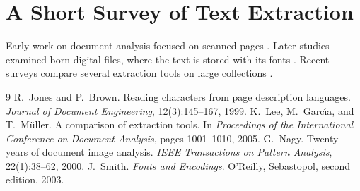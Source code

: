 \documentclass[11pt]{article}
\begin{document}
\section*{A Short Survey of Text Extraction}
Early work on document analysis focused on scanned pages \cite{nagy2000}. Later studies examined
born-digital files, where the text is stored with its fonts \cite{smith2003,jones1999}. Recent
surveys compare several extraction tools on large collections \cite{lee2005}.
\begin{thebibliography}{9}
 R.~Jones and P.~Brown. Reading characters from page description languages.
\emph{Journal of Document Engineering}, 12(3):145--167, 1999.
 K.~Lee, M.~Garc\'{\i}a, and T.~M\"uller. A comparison of extraction tools.
In \emph{Proceedings of the International Conference on Document Analysis}, pages 1001--1010, 2005.
 G.~Nagy. Twenty years of document image analysis.
\emph{IEEE Transactions on Pattern Analysis}, 22(1):38--62, 2000.
 J.~Smith. \emph{Fonts and Encodings}. O'Reilly, Sebastopol, second edition, 2003.
\end{thebibliography}
\end{document}
